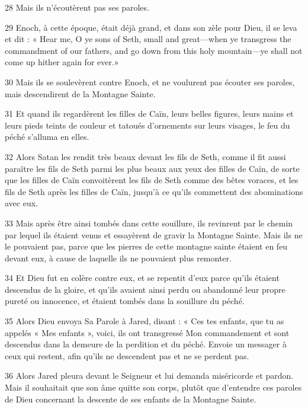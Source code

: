 \par 28 Mais ils n'écoutèrent pas ses paroles.

\par 29 Enoch, à cette époque, était déjà grand, et dans son zèle pour Dieu, il se leva et dit : « Hear me, O ye sons of Seth, small and great—when ye transgress the commandment of our fathers, and go down from this holy mountain—ye shall not come up hither again for ever.»

\par 30 Mais ils se soulevèrent contre Enoch, et ne voulurent pas écouter ses paroles, mais descendirent de la Montagne Sainte.

\par 31 Et quand ils regardèrent les filles de Caïn, leurs belles figures, leurs mains et leurs pieds teints de couleur et tatoués d'ornements sur leurs visages, le feu du péché s'alluma en elles.

\par 32 Alors Satan les rendit très beaux devant les fils de Seth, comme il fit aussi paraître les fils de Seth parmi les plus beaux aux yeux des filles de Caïn, de sorte que les filles de Caïn convoitèrent les fils de Seth comme des bêtes voraces, et les fils de Seth après les filles de Caïn, jusqu'à ce qu'ils commettent des abominations avec eux.

\par 33 Mais après être ainsi tombés dans cette souillure, ils revinrent par le chemin par lequel ils étaient venus et essayèrent de gravir la Montagne Sainte. Mais ils ne le pouvaient pas, parce que les pierres de cette montagne sainte étaient en feu devant eux, à cause de laquelle ils ne pouvaient plus remonter.

\par 34 Et Dieu fut en colère contre eux, et se repentit d'eux parce qu'ils étaient descendus de la gloire, et qu'ils avaient ainsi perdu ou abandonné leur propre pureté ou innocence, et étaient tombés dans la souillure du péché.

\par 35 Alors Dieu envoya Sa Parole à Jared, disant : « Ces tes enfants, que tu as appelés « Mes enfants », voici, ils ont transgressé Mon commandement et sont descendus dans la demeure de la perdition et du péché. Envoie un messager à ceux qui restent, afin qu'ils ne descendent pas et ne se perdent pas.

\par 36 Alors Jared pleura devant le Seigneur et lui demanda miséricorde et pardon. Mais il souhaitait que son âme quitte son corps, plutôt que d'entendre ces paroles de Dieu concernant la descente de ses enfants de la Montagne Sainte.

